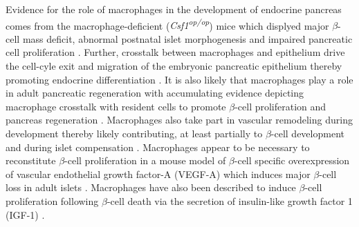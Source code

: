 \par Evidence for the role of macrophages in the development of endocrine pancreas comes from the macrophage-deficient (\textit{Csf1\textsuperscript{op/op}}) mice which displyed major $\beta$-cell mass deficit, abnormal postnatal islet morphogenesis and impaired pancreatic cell proliferation \textbf{\cite{l_insulin_2004}}. Further, crosstalk between macrophages and epithelium drive the cell-cyle exit and migration of the embryonic pancreatic epithelium thereby promoting endocrine differentiation \textbf{\cite{mussar_macrophageepithelium_2014}}. It is also likely that macrophages play a role in adult pancreatic regeneration with accumulating evidence depicting macrophage crosstalk with resident cells to promote $\beta$-cell proliferation and pancreas regeneration \textbf{\cite{cruz_macrophages_2020}}. Macrophages also take part in vascular remodeling during development thereby likely contributing, at least partially to $\beta$-cell development \textbf{\cite{van_gassen_concise_2015}} and during islet compensation \textbf{\cite{chittezhath_islet_2019}}. Macrophages appear to be necessary to reconstitute $\beta$-cell proliferation in a mouse model of $\beta$-cell specific overexpression of vascular endothelial growth factor-A (VEGF-A) which induces major $\beta$-cell loss in adult islets \textbf{\cite{brissova_islet_2014}}. Macrophages have also been described to induce $\beta$-cell proliferation following $\beta$-cell death via the secretion of insulin-like growth factor 1 (IGF-1) \textbf{\cite{nackiewicz_islet_2020}}.\\ 

